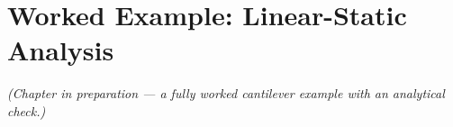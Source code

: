 \chapter{Worked Example: Linear-Static Analysis}
\label{ch:worked-example}


\emph{(Chapter in preparation --- a fully worked cantilever example with
an analytical check.)}
